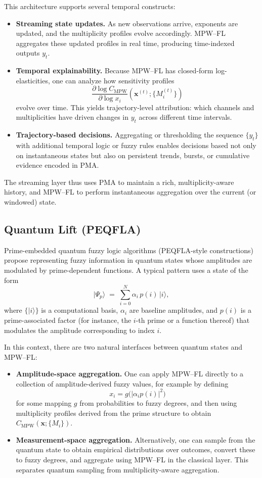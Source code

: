 \documentclass[11pt]{article}
\begin{document}
This architecture supports several temporal constructs:
\begin{itemize}
  \item \textbf{Streaming state updates.} As new observations arrive, exponents are updated, and the multiplicity profiles evolve accordingly. MPW--FL aggregates these updated profiles in real time, producing time-indexed outputs $y_t$.
  \item \textbf{Temporal explainability.} Because MPW--FL has closed-form log-elasticities, one can analyze how sensitivity profiles
  \[
    \frac{\partial \log C_{\mathrm{MPW}}}{\partial \log x_i}(\mathbf{x}^{(t)};\{M_i^{(t)}\})
  \]
  evolve over time. This yields trajectory-level attribution: which channels and multiplicities have driven changes in $y_t$ across different time intervals.
  \item \textbf{Trajectory-based decisions.} Aggregating or thresholding the sequence $\{y_t\}$ with additional temporal logic or fuzzy rules enables decisions based not only on instantaneous states but also on persistent trends, bursts, or cumulative evidence encoded in PMA.
\end{itemize}

The streaming layer thus uses PMA to maintain a rich, multiplicity-aware history, and MPW--FL to perform instantaneous aggregation over the current (or windowed) state.

\subsection{Quantum Lift (PEQFLA)}
\label{subsec:quantum-lift}

Prime-embedded quantum fuzzy logic algorithms (PEQFLA-style constructions) propose representing fuzzy information in quantum states whose amplitudes are modulated by prime-dependent functions. A typical pattern uses a state of the form
\[
  \lvert \Psi_p \rangle \;=\; \sum_{i=0}^N \alpha_i\,p(i)\,\lvert i \rangle,
\]
where $\{\lvert i \rangle\}$ is a computational basis, $\alpha_i$ are baseline amplitudes, and $p(i)$ is a prime-associated factor (for instance, the $i$-th prime or a function thereof) that modulates the amplitude corresponding to index $i$.

In this context, there are two natural interfaces between quantum states and MPW--FL:
\begin{itemize}
  \item \textbf{Amplitude-space aggregation.} One can apply MPW--FL directly to a collection of amplitude-derived fuzzy values, for example by defining
  \[
    x_i = g\big(|\alpha_i p(i)|^2\big)
  \]
  for some mapping $g$ from probabilities to fuzzy degrees, and then using multiplicity profiles derived from the prime structure to obtain $C_{\mathrm{MPW}}(\mathbf{x};\{M_i\})$.
  \item \textbf{Measurement-space aggregation.} Alternatively, one can sample from the quantum state to obtain empirical distributions over outcomes, convert these to fuzzy degrees, and aggregate using MPW--FL in the classical layer. This separates quantum sampling from multiplicity-aware aggregation.
\end{itemize}
\end{document}
